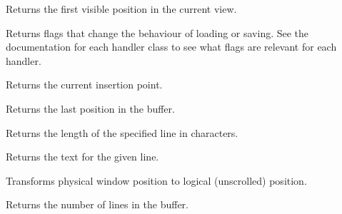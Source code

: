 
Returns the first visible position in the current view.

\label{wxrichtextfilehandlergethandlerflags}


Returns flags that change the behaviour of loading or saving. See the documentation for each
handler class to see what flags are relevant for each handler.

\label{wxrichtextctrlgetinsertionpoint}


Returns the current insertion point.

\label{wxrichtextctrlgetlastposition}


Returns the last position in the buffer.

\label{wxrichtextctrlgetlinelength}


Returns the length of the specified line in characters.

\label{wxrichtextctrlgetlinetext}


Returns the text for the given line.

\label{wxrichtextctrlgetlogicalpoint}


Transforms physical window position to logical (unscrolled) position.

\label{wxrichtextctrlgetnumberoflines}


Returns the number of lines in the buffer.

\label{wxrichtextctrlgetphysicalpoint}


